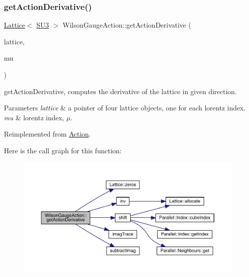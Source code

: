 \subsubsection{\texorpdfstring{getActionDerivative()}{getActionDerivative()}}
{\footnotesize\ttfamily \mbox{\hyperlink{class_lattice}{Lattice}}$<$ \mbox{\hyperlink{class_s_u3}{S\+U3}} $>$ Wilson\+Gauge\+Action\+::get\+Action\+Derivative (\begin{DoxyParamCaption}\item[{\mbox{\hyperlink{class_lattice}{Lattice}}$<$ \mbox{\hyperlink{class_s_u3}{S\+U3}} $>$ $\ast$}]{lattice,  }\item[{int}]{mu }\end{DoxyParamCaption})\hspace{0.3cm}{\ttfamily [virtual]}}



get\+Action\+Derivative, computes the derivative of the lattice in given direction. 


\begin{DoxyParams}{Parameters}
{\em lattice} & a pointer of four lattice objects, one for each lorentz index. \\
\hline
{\em mu} & lorentz index, $\mu$. \\
\hline
\end{DoxyParams}


Reimplemented from \mbox{\hyperlink{class_action_a78168dd7c3819a3365e28fc1aae1b9b6}{Action}}.

Here is the call graph for this function\+:
\nopagebreak
\begin{figure}[H]
\begin{center}
\leavevmode
\includegraphics[width=350pt]{class_wilson_gauge_action_a43cf939cd53495b7225fbeaa8a0ff6e8_cgraph}
\end{center}
\end{figure}
\mbox{\label{class_wilson_gauge_action_a60f2892e61489004df3cde6cc856b00b}} 
